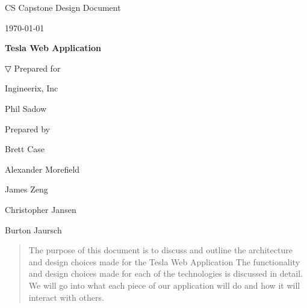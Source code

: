 \documentclass[onecolumn, draftclsnofoot,10pt, compsoc]{IEEEtran}
\def \CapstoneTeamName{                 The Ingineers}
\def \CapstoneTeamNumber{               22}
\def \GroupMemberOne{                   Brett Case}
\def \GroupMemberTwo{                   Alexander Morefield}
\def \GroupMemberThree{                 James Zeng}
\def \GroupMemberFour{                  Christopher Jansen}
\def \GroupMemberFive{                  Burton Jaursch}
\def \CapstoneProjectName{              Tesla Web Application}
\def \CapstoneSponsorCompany{           Ingineerix, Inc}
\def \CapstoneSponsorPerson{            Phil Sadow}
\def \DocType{                  %
                                Design Document
                                }
\newcommand{\NameSigPair}[1]{\par
\makebox[2.75in][r]{#1} \hfil   \makebox[3.25in]{\makebox[2.25in]{\hrulefill} \hfill            \makebox[.75in]{\hrulefill}}
\par\vspace{-12pt} \textit{\tiny\noindent
\makebox[2.75in]{} \hfil                \makebox[3.25in]{\makebox[2.25in][r]{Signature} \hfill  \makebox[.75in][r]{Date}}}}
\renewcommand{\NameSigPair}[1]{#1}
\begin{document}
\begin{titlepage}
    \begin{singlespace}
        \hfill
        \par\vspace{.2in}
        \centering
        \scshape{
            \huge CS Capstone \DocType \par
            {\large\today}\par
            \vspace{.5in}
            \textbf{\Huge\CapstoneProjectName}\par
            \vfill

▽
            \vfill
            {\large Prepared for}\par
            \Huge \CapstoneSponsorCompany\par
            \vspace{5pt}
            {\Large\NameSigPair{\CapstoneSponsorPerson}\par}
            {\large Prepared by }\par
            \vspace{5pt}
            {\Large
                \NameSigPair{\GroupMemberOne}\par
                \NameSigPair{\GroupMemberTwo}\par
                \NameSigPair{\GroupMemberThree}\par
                \NameSigPair{\GroupMemberFour}\par
                \NameSigPair{\GroupMemberFive}\par
            }
            \vspace{20pt}
        }
        \begin{abstract}
        The purpose of this document is to discuss and outline the architecture and design choices made for the Tesla Web Application
        The functionality and design choices made for each of the technologies is discussed in detail.
        We will go into what each piece of our application will do and how it will interact with others.
        \end{abstract}
    \end{singlespace}
\end{titlepage}
\newpage
{}
\tableofcontents
\clearpage
\end{document}
